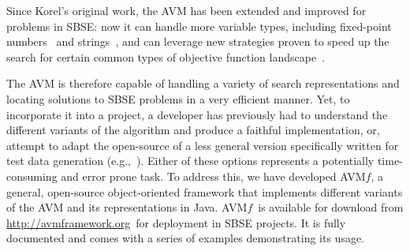 \documentclass{llncs}
\newcommand{\name}{\mbox{AVM\hspace{-1pt}$f$}\xspace}
\newcommand{\repourl}{\url{http://avmframework.org}\xspace}
\begin{document}
Since Korel's original work, the AVM has been extended and improved for problems in SBSE: now it can handle more variable
types, including fixed-point numbers~\cite{Harman2007} and strings~\cite{Kapfhammer2013,McMinn2015}, and can leverage
new strategies proven to speed up the search for certain common types of objective function landscape~\cite{Kempka2013,Kempka2015}.

The AVM is therefore capable of handling a variety of search representations and locating solutions to SBSE problems in
a very efficient manner. Yet, to incorporate it into a project, a developer has previously had to understand the
different variants of the algorithm and produce a faithful implementation, or, attempt to adapt the open-source of a
less general version specifically written for test data generation (e.g.,~\cite{Lakhotia2013}). Either of these options represents a potentially time-consuming and error prone task. To address this, we have developed \name, a general, open-source object-oriented framework that
implements different variants of the AVM and its representations in Java. \name~is available for download
from \repourl~for deployment in SBSE projects. It is fully documented and comes with a series of examples demonstrating its usage.


\end{document}
